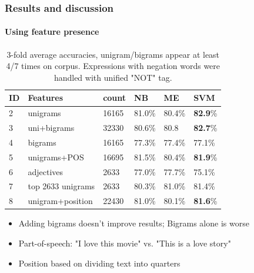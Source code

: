 \documentclass{beamer}
\begin{document}
\begin{frame}
	\frametitle{Results and discussion}
	\framesubtitle{Using feature presence}
	\begin{center}
		\begin{table}
			\begin{tabular}{l | l | l || l | l | l}
				ID & Features & count & NB & ME & SVM \\ \hline \hline
				2 & unigrams & 16165 & 81.0\% & 80.4\% & \textbf{82.9}\% \\
				3 & uni+bigrams & 32330 & 80.6\% & 80.8 & \textbf{82.7}\% \\
				4 & bigrams & 16165 & 77.3\% & 77.4\% & 77.1\% \\ \hline \hline
				5 & unigrams+POS & 16695 & 81.5\% & 80.4\% & \textbf{81.9}\% \\
				6 & adjectives & 2633 & 77.0\% & 77.7\% & 75.1\% \\
				7 & top 2633 unigrams & 2633 & 80.3\% & 81.0\% & 81.4\% \\
				8 & unigram+position & 22430 & 81.0\% & 80.1\% & \textbf{81.6}\% \\
			\end{tabular}
			\caption{3-fold average accuracies, unigram/bigrams appear at least 4/7 times on corpus. Expressions with negation words were handled with unified "NOT" tag. }
		\end{table}
	\end{center}
	\pause
	\begin{itemize}
		\item Adding bigrams doesn't improve results; Bigrams alone is worse
		\item Part-of-speech: "I love this movie" vs. "This is a love story"
		\item Position based on dividing text into quarters
	\end{itemize}
\end{frame}
\end{document}
